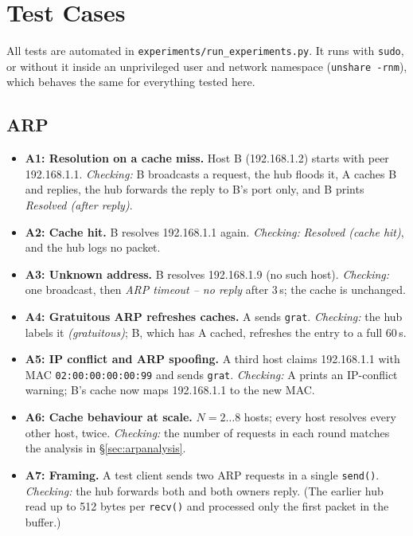 \documentclass[11pt]{article}
\begin{document}
\section{Test Cases}
\label{sec:tests}
All tests are automated in \texttt{experiments/run\_experiments.py}. It runs with
\texttt{sudo}, or without it inside an unprivileged user and network namespace
(\texttt{unshare -rnm}), which behaves the same for everything tested here.

\subsection{ARP}
\begin{itemize}[leftmargin=1.6em]
  \item \textbf{A1: Resolution on a cache miss.} Host B (192.168.1.2) starts with peer
  192.168.1.1. \emph{Checking:} B broadcasts a request, the hub floods it, A caches B and
  replies, the hub forwards the reply to B's port only, and B prints
  \emph{Resolved (after reply)}.
  \item \textbf{A2: Cache hit.} B resolves 192.168.1.1 again. \emph{Checking:}
  \emph{Resolved (cache hit)}, and the hub logs no packet.
  \item \textbf{A3: Unknown address.} B resolves 192.168.1.9 (no such host).
  \emph{Checking:} one broadcast, then \emph{ARP timeout -- no reply} after 3\,s; the
  cache is unchanged.
  \item \textbf{A4: Gratuitous ARP refreshes caches.} A sends \texttt{grat}.
  \emph{Checking:} the hub labels it \emph{(gratuitous)}; B, which has A cached,
  refreshes the entry to a full 60\,s.
  \item \textbf{A5: IP conflict and ARP spoofing.} A third host claims 192.168.1.1 with MAC
  \texttt{02:00:00:00:00:99} and sends \texttt{grat}. \emph{Checking:} A prints an
  IP-conflict warning; B's cache now maps 192.168.1.1 to the new MAC.
  \item \textbf{A6: Cache behaviour at scale.} $N=2\ldots8$ hosts; every host resolves
  every other host, twice. \emph{Checking:} the number of requests in each round matches
  the analysis in \S\ref{sec:arpanalysis}.
  \item \textbf{A7: Framing.} A test client sends two ARP requests in a single
  \texttt{send()}. \emph{Checking:} the hub forwards both and both owners reply. (The earlier hub read up to 512 bytes per
  \texttt{recv()} and processed only the first packet in the buffer.)
\end{itemize}
\end{document}

